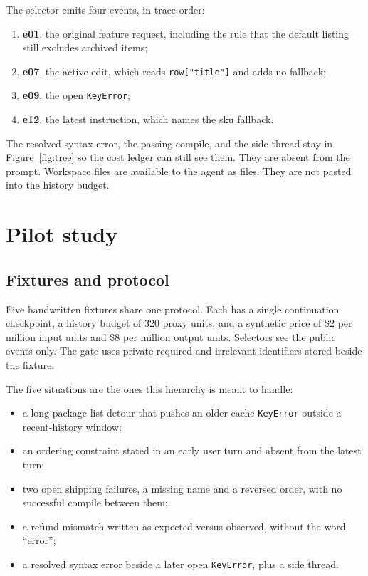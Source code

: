 \documentclass[11pt]{article}
\begin{document}
The selector emits four events, in trace order:
\begin{enumerate}
  \item \textbf{e01}, the original feature request, including the rule that the default listing still excludes archived items;
  \item \textbf{e07}, the active edit, which reads \texttt{row["title"]} and adds no fallback;
  \item \textbf{e09}, the open \texttt{KeyError};
  \item \textbf{e12}, the latest instruction, which names the sku fallback.
\end{enumerate}
The resolved syntax error, the passing compile, and the side thread stay in Figure~\ref{fig:tree} so the cost ledger can still see them.
They are absent from the prompt.
Workspace files are available to the agent as files.
They are not pasted into the history budget.

\section{Pilot study}
\label{sec:pilot}

\subsection{Fixtures and protocol}

Five handwritten fixtures share one protocol.
Each has a single continuation checkpoint, a history budget of 320 proxy units, and a synthetic price of \$2 per million input units and \$8 per million output units.
Selectors see the public events only.
The gate uses private required and irrelevant identifiers stored beside the fixture.

The five situations are the ones this hierarchy is meant to handle:
\begin{itemize}
  \item a long package-list detour that pushes an older cache \texttt{KeyError} outside a recent-history window;
  \item an ordering constraint stated in an early user turn and absent from the latest turn;
  \item two open shipping failures, a missing name and a reversed order, with no successful compile between them;
  \item a refund mismatch written as expected versus observed, without the word ``error'';
  \item a resolved syntax error beside a later open \texttt{KeyError}, plus a side thread.
\end{itemize}
\end{document}
